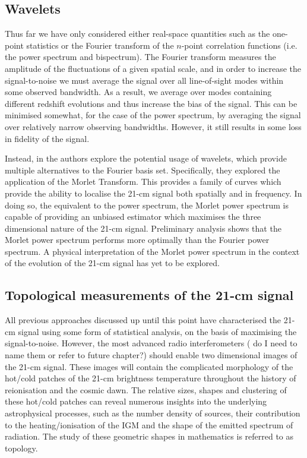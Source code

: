 \subsection{Wavelets}

Thus far we have only considered either real-space quantities such as the one-point statistics or the Fourier transform of the $n$-point correlation functions (i.e. the power spectrum and bispectrum). The Fourier transform measures the amplitude of the fluctuations of a given spatial scale, and in order to increase the signal-to-noise we must average the signal over all line-of-sight modes within some observed bandwidth. As a result, we average over modes containing different redshift evolutions and thus increase the bias of the signal. This can be minimised somewhat, for the case of the power spectrum, by averaging the signal over relatively narrow observing bandwidths. However, it still results in some loss in fidelity of the signal.

Instead, in \cite{Trott:2016} the authors explore the potential usage of wavelets, which provide multiple alternatives to the Fourier basis set. Specifically, they explored the application of the Morlet Transform. This provides a family of curves which provide the ability to localise the 21-cm signal both spatially and in frequency. In doing so, the equivalent to the power spectrum, the Morlet power spectrum is capable of providing an unbiased estimator which maximises the three dimensional nature of the 21-cm signal. Preliminary analysis shows that the Morlet power spectrum performs more optimally than the Fourier power spectrum. A physical interpretation of the Morlet power spectrum in the context of the evolution of the 21-cm signal has yet to be explored.

\subsection{Topological measurements of the 21-cm signal} \label{sec:topology}

All previous approaches discussed up until this point have characterised the 21-cm signal using some form of statistical analysis, on the basis of maximising the signal-to-noise. However, the most advanced radio interferometers ({\color{red} do I need to name them or refer to future chapter?}) should enable two dimensional images of the 21-cm signal. These images will contain the complicated morphology of the hot/cold patches of the 21-cm brightness temperature throughout the history of reionisation and the cosmic dawn. The relative sizes, shapes and clustering of these hot/cold patches can reveal numerous insights into the underlying astrophysical processes, such as the number density of sources, their contribution to the heating/ionisation of the IGM and the shape of the emitted spectrum of radiation. The study of these geometric shapes in mathematics is referred to as topology.

